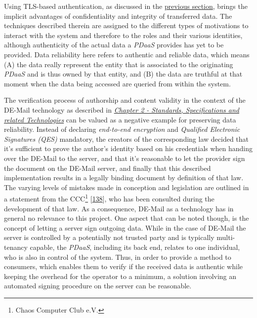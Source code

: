 \documentclass[12pt,english,a4paper,titlepage,cleardoublepage=empty,dottedtoc]{report}
\begin{document}
Using TLS-based authentication, as discussed in the
\protect\hyperlink{authentication}{previous section}, brings the
implicit advantages of confidentiality and integrity of transferred
data. The techniques described therein are assigned to the different
types of motivations to interact with the system and therefore to the
roles and their various identities, although authenticity of the actual
data a \emph{PDaaS} provides has yet to be provided. Data reliability
here refers to authentic and reliable data, which means (A) the data
really represent the entity that is associated to the originating
\emph{PDaaS} and is thus owned by that entity, and (B) the data are
truthful at that moment when the data being accessed are queried from
within the system.

The verification process of authorship and content validity in the
context of the DE-Mail technology as described in
\emph{\protect\hyperlink{standards-specifications-and-related-technologies}{Chapter
2 - Standards, Specifications and related Technologies}} can be valued
as a negative example for preserving data reliability. Instead of
declaring \emph{end-to-end encryption} and \emph{Qualified Electronic
Signatures (QES)} mandatory, the creators of the corresponding law
decided that it's sufficient to prove the author's identity based on his
credentials when handing over the DE-Mail to the server, and that it's
reasonable to let the provider sign the document on the DE-Mail server,
and finally that this described implementation results in a legally
binding document by definition of that law. The varying levels of
mistakes made in conception and legislation are outlined in a statement
from the CCC\footnote{Chaos Computer Club e.V.}
{[}\protect\hyperlink{ref-statement_2013_de-mail}{138}{]}, who has been
consulted during the development of that law. As a consequence, DE-Mail
as a technology has in general no relevance to this project. One aspect
that can be noted though, is the concept of letting a server sign
outgoing data. While in the case of DE-Mail the server is controlled by
a potentially not trusted party and is typically multi-tenancy capable,
the \emph{PDaaS}, including its back end, relates to one individual, who
is also in control of the system. Thus, in order to provide a method to
consumers, which enables them to verify if the received data is
authentic while keeping the overhead for the operator to a minimum, a
solution involving an\\
automated signing procedure on the server can be reasonable.
\end{document}

